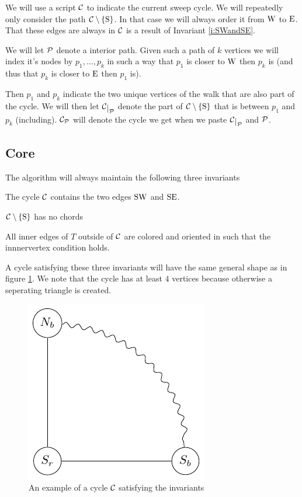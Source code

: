 We will use a script $\C$ to indicate the current sweep cycle.
We will repeatedly only consider the path $\cpath$. In that case we will always order it from $\pW$ to $\pE$. That these edges are always in $\C$ is a result of Invariant \ref{i:SWandSE}.

We will let $\P$ denote a interior path. Given such a path of $k$ vertices we will index it's nodes by $p_1, \ldots, p_k$ in such a way that $p_1$ is closer to $\pW$ then $p_k$ is (and thus that $p_k$ is closer to $\pE$ then $p_1$ is).

Then $p_1$ and $p_k$ indicate the two unique vertices of the walk that are also part of the cycle. We will then let $\restC{\P}$ denote the part of $\cpath$ that is between $p_1$ and $p_k$ (including). $\C_\P$ will denote the cycle we get when we paste $\restC{\P}$ and $\P$.



\subsection{Core}
\label{ss:core}

The algorithm will always maintain the following three invariants

\begin{invariants}
  \itemsep=-4pt

\item \label{i:SWandSE} The cycle $\C$ contains the two edges $\pS \pW$ and $\pS \pE$.
\item \label{i:noChords} $\cpath$ has no chords
\item \label{i:last} All inner edges of $T$ outside of $\C$ are colored and oriented in such that the innnervertex condition holds. %
\end{invariants}

A cycle satisfying these three invariants will have the same general shape as in figure \ref{fig:invCycle}. We note that the cycle has at least $4$ vertices because otherwise a seperating triangle is created.

\begin{figure}[h!]
\centering
\includegraphics{algo/img/invCycle}

\caption{An example of a cycle $\C$ satisfying the invariants
    \label{fig:invCycle}}
\end{figure}

